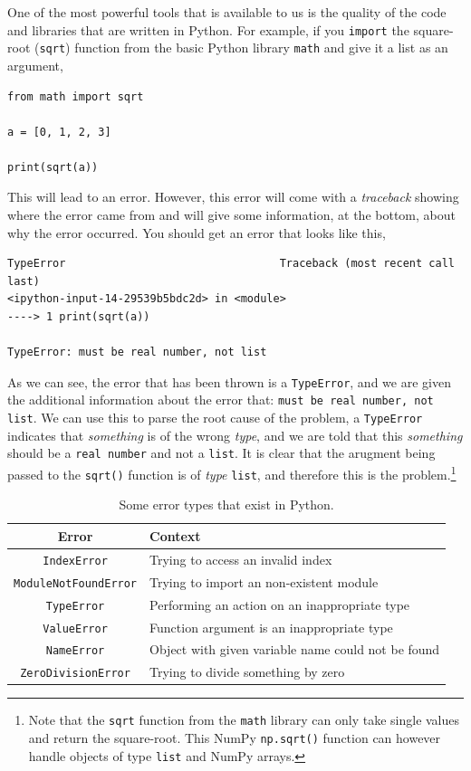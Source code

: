 \documentclass[a4paper]{article}
\begin{document}
One of the most powerful tools that is available to us is the quality of the code and libraries that are written in Python.
For example, if you \texttt{import} the square-root (\texttt{sqrt}) function from the basic Python library \texttt{math} and give it a list as an argument,
\begin{lstlisting}
from math import sqrt

a = [0, 1, 2, 3]

print(sqrt(a))
\end{lstlisting}
This will lead to an error.
However, this error will come with a \emph{traceback} showing where the error came from and will give some information, at the bottom, about why the error occurred.
You should get an error that looks like this,
\begin{lstlisting}
TypeError                                 Traceback (most recent call last)
<ipython-input-14-29539b5bdc2d> in <module>
----> 1 print(sqrt(a))

TypeError: must be real number, not list
\end{lstlisting}
As we can see, the error that has been thrown is a \texttt{TypeError}, and we are given the additional information about the error that: \texttt{must be real number, not list}.
We can use this to parse the root cause of the problem, a \texttt{TypeError} indicates that \emph{something} is of the wrong \emph{type}, and we are told that this \emph{something} should be a \texttt{real number} and not a \texttt{list}.
It is clear that the arugment being passed to the \texttt{sqrt()} function is of \emph{type} \texttt{list}, and therefore this is the problem.\footnote{Note that the \texttt{sqrt} function from the \texttt{math} library can only take single values and return the square-root. This NumPy \texttt{np.sqrt()} function can however handle objects of type \texttt{list} and NumPy arrays.}
\begin{table}[h]
	\centering
	\caption{Some error types that exist in Python.}
	\label{tab:ops}
	\begin{tabular}{c p{}}
		\hline
		Error & Context \\
		\hline
		\texttt{IndexError} & Trying to access an invalid index \\
		\texttt{ModuleNotFoundError} & Trying to import an non-existent module \\
		\texttt{TypeError} & Performing an action on an inappropriate type \\
		\texttt{ValueError} & Function argument is an inappropriate type \\
		\texttt{NameError} & Object with given variable name could not be found \\
		\texttt{ZeroDivisionError} & Trying to divide something by zero \\
		\hline
	\end{tabular}
\end{table}
\vspace{\baselineskip}
\end{document}
